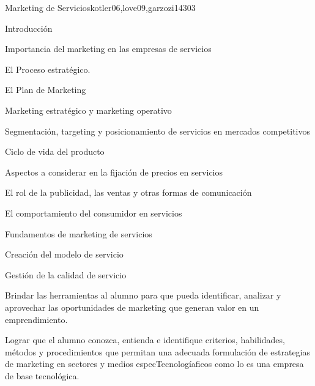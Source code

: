 \begin{syllabus}
   \begin{unit}{Marketing de Servicios}{}{kotler06,love09,garzozi14}{30}{3}
   \begin{topics}
         \item Introducción
         \item Importancia del marketing en las empresas de servicios
         \item El Proceso estratégico.
         \item El Plan de Marketing
         \item Marketing estratégico y marketing operativo
         \item Segmentación, targeting y posicionamiento de servicios en mercados competitivos
         \item Ciclo de vida del producto
          \item Aspectos a considerar en la fijación de precios en servicios
          \item El rol de la publicidad, las ventas y otras formas de comunicación
         \item El comportamiento del consumidor en servicios
         \item Fundamentos de marketing de servicios
         \item Creación del modelo de servicio
         \item Gestión de la calidad de servicio
      \end{topics}
      \begin{learningoutcomes}
         \item Brindar las herramientas al alumno para que pueda identificar, analizar y aprovechar las oportunidades de marketing que generan valor en un emprendimiento.
         \item Lograr que el alumno conozca, entienda e identifique criterios, habilidades, métodos y procedimientos que permitan una adecuada formulación de estrategias de marketing en sectores y medios especTecnologíaficos como lo es una empresa de base tecnológica.
      \end{learningoutcomes}
   \end{unit}
   

\end{syllabus}

